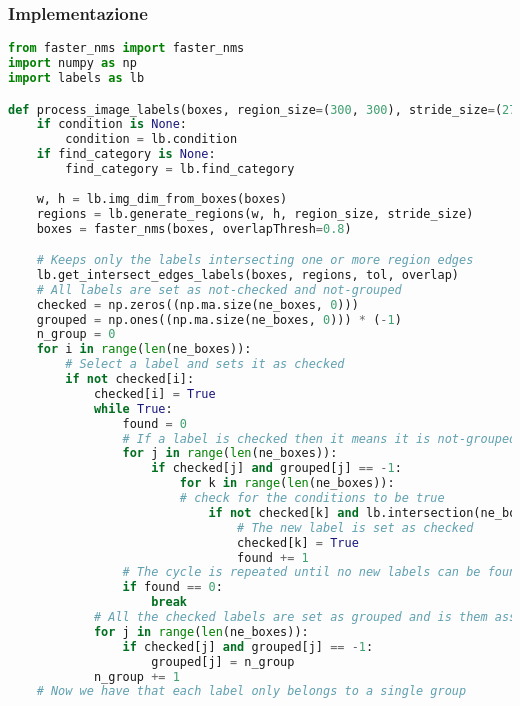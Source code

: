 \subsubsection{Implementazione}
\begin{lstlisting}[language=Python, caption=Python example]
from faster_nms import faster_nms
import numpy as np
import labels as lb

def process_image_labels(boxes, region_size=(300, 300), stride_size=(270, 270), overlap=(0, 0), tol=0, condition=None, find_category=None, matching=None):
    if condition is None:
        condition = lb.condition
    if find_category is None:
        find_category = lb.find_category
        
    w, h = lb.img_dim_from_boxes(boxes)
    regions = lb.generate_regions(w, h, region_size, stride_size)
    boxes = faster_nms(boxes, overlapThresh=0.8)

    # Keeps only the labels intersecting one or more region edges
    lb.get_intersect_edges_labels(boxes, regions, tol, overlap)
    # All labels are set as not-checked and not-grouped
    checked = np.zeros((np.ma.size(ne_boxes, 0)))
    grouped = np.ones((np.ma.size(ne_boxes, 0))) * (-1)
    n_group = 0
    for i in range(len(ne_boxes)):
        # Select a label and sets it as checked
        if not checked[i]:
            checked[i] = True
            while True:
                found = 0
                # If a label is checked then it means it is not-grouped
                for j in range(len(ne_boxes)):
                    if checked[j] and grouped[j] == -1:
                        for k in range(len(ne_boxes)):
                        # check for the conditions to be true
                            if not checked[k] and lb.intersection(ne_boxes[j, :], ne_boxes[k, :], tol) and condition(ne_boxes[j, :], ne_boxes[k, :]) and lb.intersect_common_edge(ne_boxes[j, :], ne_boxes[k, :], regions, tol, overlap) and lb.matched(ne_boxes[j, :], ne_boxes[k, :]) and lb.matched(ne_boxes[j, :], ne_boxes[k, :]) and not lb.belong_same_region_strict_group(ne_boxes[k, :], checked_boxes, regions, tol):
                                # The new label is set as checked
                                checked[k] = True
                                found += 1
                # The cycle is repeated until no new labels can be found
                if found == 0:
                    break
            # All the checked labels are set as grouped and is them assigned a number with the purpose of identify their group ID
            for j in range(len(ne_boxes)):
                if checked[j] and grouped[j] == -1:
                    grouped[j] = n_group
            n_group += 1
    # Now we have that each label only belongs to a single group


\end{lstlisting}
